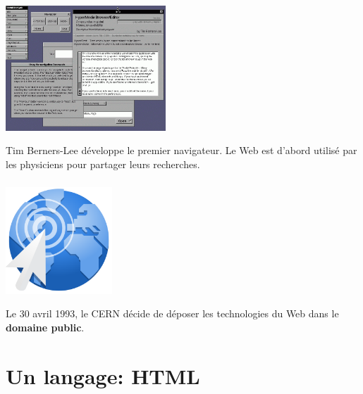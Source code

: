\documentclass[svgnames,11pt]{beamer}
\begin{document}
\begin{frame}
    \frametitle{}

    \begin{center}
        \centering
        \includegraphics[width=6cm]{ressources/WorldWideWeb.png}
        \label{IMG}
    \end{center}
    \begin{aretenir}[]
        Tim Berners-Lee développe le premier navigateur. Le Web est d'abord utilisé par les physiciens pour partager leurs recherches.
    \end{aretenir}
\end{frame}
\begin{frame}
    \frametitle{}

    \begin{center}
        \centering
        \includegraphics[width=4cm]{ressources/milliard.png}
        \label{IMG}
    \end{center}
    \begin{aretenir}[]
        Le 30 avril 1993, le CERN décide de déposer les technologies du Web dans le \textbf{domaine public}.
    \end{aretenir}
\end{frame}
\section{Un langage: HTML}
\end{document}
